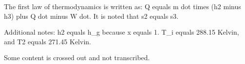 The first law of thermodynamics is written as:  
Q equals m dot times (h2 minus h3) plus Q dot minus W dot.  
It is noted that s2 equals s3.  

Additional notes:  
h2 equals h_g because x equals 1.  
T_i equals 288.15 Kelvin, and T2 equals 271.45 Kelvin.  

Some content is crossed out and not transcribed.